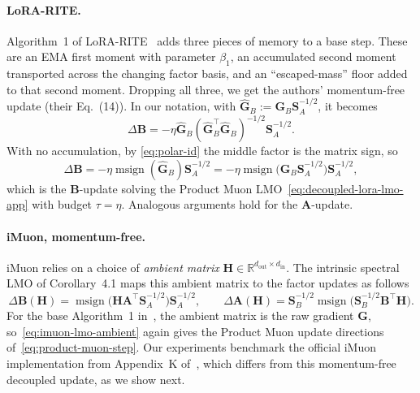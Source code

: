\documentclass[11pt]{article}
\newcommand{\mat}[1]{\bm{#1}}
\newcommand{\R}{\mathbb{R}}
\DeclareMathOperator{\msign}{msign}          %
\begin{document}
\paragraph{LoRA-RITE.}
Algorithm~1 of LoRA-RITE~\cite{lorarite} adds three pieces of memory to a base step. These are an EMA first moment with parameter $\beta_1$, an accumulated second moment transported across the changing factor basis, and an ``escaped-mass'' floor added to that second moment.
Dropping all three, we get the authors' momentum-free update (their Eq.~(14)).
In our notation, with $\widehat{\mat{G}}_B := \mat{G}_B \mat{S}_A^{-1/2}$, it becomes
\[
  \Delta\mat{B}=-\eta \widehat{\mat{G}}_B (\widehat{\mat{G}}_B^\top\widehat{\mat{G}}_B)^{-1/2} \mat{S}_A^{-1/2}.
\]
With no accumulation, by \eqref{eq:polar-id} the middle factor is the matrix sign, so
\begin{equation*}
  \Delta\mat{B}=-\eta \msign(\widehat{\mat{G}}_B) \mat{S}_A^{-1/2}
  =-\eta \msign \big(\mat{G}_B \mat{S}_A^{-1/2}\big) \mat{S}_A^{-1/2},
\end{equation*}
which is the $\mat{B}$-update solving the Product Muon LMO~\eqref{eq:decoupled-lora-lmo-app} with budget $\tau=\eta$. Analogous arguments hold for the $\mat{A}$-update.


\paragraph{iMuon, momentum-free.}
iMuon relies on a choice of \emph{ambient matrix} $\mat{H}\in\R^{d_{\mathrm{out}}\times d_{\mathrm{in}}}$. The intrinsic spectral LMO of Corollary~4.1 maps this ambient matrix to the factor updates as follows
\begin{equation}
  \Delta\mat{B}(\mat{H}) =\msign \big(\mat{H}\mat{A}^\top \mat{S}_A^{-1/2}\big)\mat{S}_A^{-1/2},\qquad
  \Delta\mat{A}(\mat{H}) =\mat{S}_B^{-1/2}\msign \big(\mat{S}_B^{-1/2}\mat{B}^\top \mat{H}\big).
  \label{eq:imuon-lmo-ambient}
\end{equation}
For the base Algorithm~1 in~\cite{imuon}, the ambient matrix is the raw gradient $\mat{G}$, so~\eqref{eq:imuon-lmo-ambient}
again gives the Product Muon update directions of~\eqref{eq:product-muon-step}. Our experiments benchmark the official iMuon implementation from Appendix~K of~\cite{imuon}, which differs from this momentum-free decoupled update, as we show next.
\end{document}

